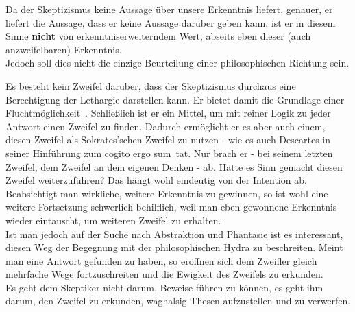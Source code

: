 \documentclass[12pt,a4paper]{article}
\begin{document}
Da der Skeptizismus keine Aussage über unsere Erkenntnis liefert, genauer, er liefert die Aussage, dass er keine Aussage darüber geben kann, ist er in diesem Sinne \textbf{nicht} von erkenntniserweiterndem Wert, abseits eben dieser (auch anzweifelbaren) Erkenntnis.\\
Jedoch soll dies nicht die einzige Beurteilung einer philosophischen Richtung sein. 

Es besteht kein Zweifel darüber, dass der Skeptizismus durchaus eine Berechtigung der Lethargie darstellen kann. Er bietet damit die Grundlage einer \glqq Fluchtmöglichkeit\grqq\ . Schließlich ist er ein Mittel, um mit reiner Logik zu jeder Antwort einen Zweifel zu finden. Dadurch ermöglicht er es aber auch einem, diesen Zweifel als Sokrates'schen Zweifel zu nutzen - wie es auch Descartes in seiner Hinführung zum \glqq cogito ergo sum\grqq\ tat. Nur brach er - bei seinem \glqq letzten Zweifel\grqq , dem Zweifel an dem eigenen Denken - ab. Hätte es Sinn gemacht diesen Zweifel weiterzuführen? Das hängt wohl eindeutig von der Intention ab. Beabsichtigt man wirkliche, weitere Erkenntnis zu gewinnen, so ist wohl eine weitere Fortsetzung schwerlich behilflich, weil man eben gewonnene Erkenntnis wieder eintauscht, um weiteren Zweifel zu erhalten.\\
Ist man jedoch auf der Suche nach Abstraktion und Phantasie ist es interessant, diesen Weg der Begegnung mit der philosophischen Hydra zu beschreiten. Meint man eine Antwort gefunden zu haben, so eröffnen sich dem Zweifler gleich mehrfache Wege fortzuschreiten und die Ewigkeit des Zweifels zu erkunden.\\
Es geht dem Skeptiker nicht darum, Beweise führen zu können, es geht ihm darum, den Zweifel zu erkunden, waghalsig Thesen aufzustellen und zu verwerfen.
\end{document}
